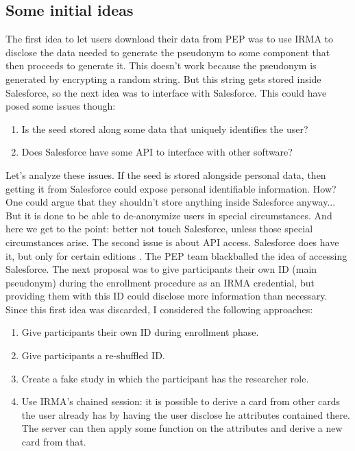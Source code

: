 \documentclass{report}
\begin{document}
\subsection{Some initial ideas}
The first idea to let users download their data from PEP was to use IRMA to disclose the data needed to generate the pseudonym to some component that then proceeds to generate it.
This doesn't work because the pseudonym is generated by encrypting a random string. But this string gets stored inside Salesforce, so the next idea was to interface with
Salesforce. This could have posed some issues though:
\begin{enumerate}
		\item Is the seed stored along some data that uniquely identifies the user?
		\item Does Salesforce have some API to interface with other software?
\end{enumerate}
Let's analyze these issues. If the seed is stored alongside personal data, then getting it from Salesforce could expose personal identifiable information. How? One could argue that
they shouldn't store anything inside Salesforce anyway... But it is done to be able to de-anonymize users in special circumstances. And here we get to the point: better not touch
Salesforce, unless those special circumstances arise. The second issue is about API access. Salesforce does have it, but only for certain editions \cite{salesforce}. The PEP team
blackballed the idea of accessing Salesforce. The next proposal was to give participants their own ID (main pseudonym) during the enrollment procedure as an IRMA credential, but
providing them with this ID could disclose more information than necessary.
Since this first idea was discarded, I considered the following approaches:
\begin{enumerate}
		\item Give participants their own ID during enrollment phase.
		\item Give participants a re-shuffled ID.
		\item Create a fake study in which the participant has the researcher role.
		\item Use IRMA’s chained session: it is possible to derive a card from other cards the user already has by having the user disclose he attributes contained there. The server can then apply some function on the attributes and derive a new card from that.
\end{enumerate}
\end{document}
